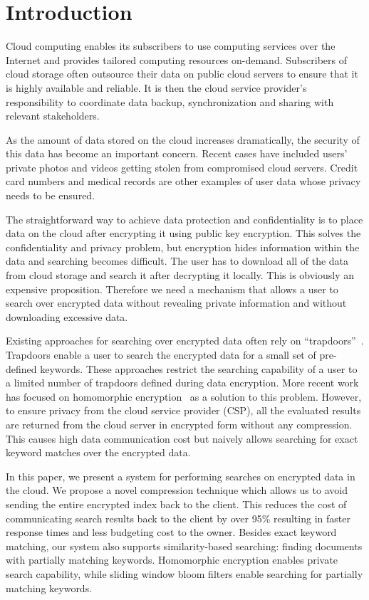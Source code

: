 \section{Introduction}

Cloud computing enables its subscribers to use computing services over the 
Internet and provides tailored computing resources on-demand. 
Subscribers of cloud storage often outsource their data on public cloud servers
to ensure that it is highly available and reliable. 
It is then the cloud service provider's
responsibility to coordinate data backup, synchronization and sharing
with relevant stakeholders. 

As the amount of data stored on the cloud increases dramatically, the security 
of this data has become an important concern. Recent cases
have included users' private photos and videos getting stolen from compromised cloud servers. Credit card numbers and medical
records are other examples of user data whose privacy needs to be ensured.

The straightforward way to achieve data protection and confidentiality is to
place data on the cloud after encrypting it using public key encryption.
This solves the confidentiality and privacy problem,
but encryption hides information within the data and searching becomes 
difficult. The user
has to download all of the data from cloud storage and search it after 
decrypting it locally. 
This is
obviously an expensive proposition. Therefore we need a mechanism 
that allows a user to search over encrypted data without revealing 
private information and without downloading excessive data.

Existing approaches for searching over encrypted data often rely on
``trapdoors''~\cite{song,goh2003secure,boneh}. 
Trapdoors enable a user to search the encrypted data for a small 
set of pre-defined keywords. These approaches restrict the searching
capability of a user to a limited number of trapdoors defined during data 
encryption. More recent work has focused on homomorphic encryption~\cite{craig,zeehan} as a solution
to this problem. However, to ensure privacy from the cloud service provider (CSP), 
all the evaluated results
are returned from the cloud server in encrypted form without any compression. This causes high data
communication cost but naively allows searching for exact keyword matches over the encrypted data.

In this paper, we present a system for performing searches on encrypted 
data in the cloud. We propose a novel compression technique which allows us to
avoid sending the entire encrypted index back to the client. This reduces
the cost of communicating search results back to the client by over 95\% resulting in 
faster response times and less budgeting cost to the owner. 
Besides exact keyword matching, our system also
supports similarity-based searching: finding documents with partially matching 
keywords. Homomorphic encryption enables private search capability, 
while sliding window 
bloom filters enable searching for partially matching keywords. 

